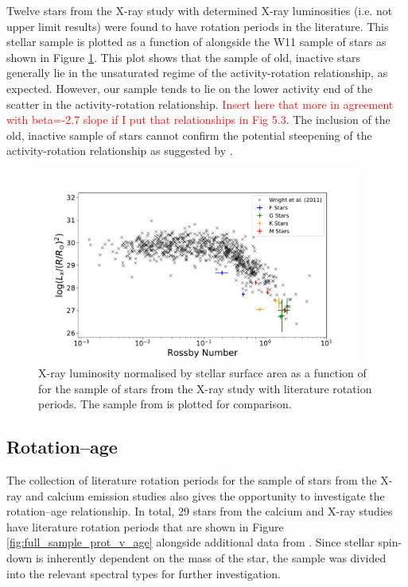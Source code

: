Twelve stars from the X-ray study \citep{Booth_etal_2017} with determined X-ray luminosities (i.e. not upper limit results) were found to have rotation periods in the literature. This stellar sample is plotted as a function of \Ro alongside the W11 sample of stars as shown in Figure \ref{fig:lx_v_ro}. This plot shows that the sample of old, inactive stars generally lie in the unsaturated regime of the activity-rotation relationship, as expected. However, our sample tends to lie on the lower activity end of the scatter in the activity-rotation relationship. \textcolor{red}{Insert here that more in agreement with beta=-2.7 slope if I put that relationships in Fig 5.3}. The inclusion of the old, inactive sample of stars cannot confirm the potential steepening of the activity-rotation relationship as suggested by \citet{Booth_etal_2017}.

\begin{figure}[!ht]
    \centering
    \includegraphics[width=0.95\textwidth]{Figures/5-Activity_rotation/lx_v_R0.pdf}
    \caption[$L_{x}$ as a function of \Ro]{X-ray luminosity normalised by stellar surface area as a function of \Ro for the sample of stars from the X-ray study with literature rotation periods. The sample from \citet{Wright_etal_2011} is plotted for comparison.}
    \label{fig:lx_v_ro}
\end{figure}

\subsection{Rotation--age}
\label{Chp5_results_rotation_age}
The collection of literature rotation periods for the sample of stars from the X-ray and calcium emission studies also gives the opportunity to investigate the rotation--age relationship. In total, 29 stars from the calcium and X-ray studies have literature rotation periods that are shown in Figure \ref{fig:full_sample_prot_v_age} alongside additional data from \citet{Metcalfe_etal_2016}. Since stellar spin-down is inherently dependent on the mass of the star, the sample was divided into the relevant spectral types for further investigation. 

